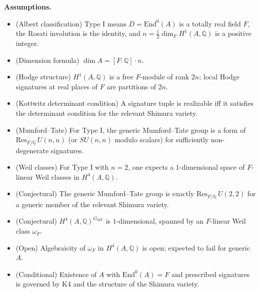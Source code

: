 \documentclass{article}
\begin{document}
\medskip

\noindent\textbf{Assumptions.}
\begin{itemize}
  \item[\textbf{K1}] (Albert classification) Type I means
    $D=\mathrm{End}^0(A)$ is a totally real field $F$, the Rosati involution is
    the identity, and $n=\tfrac12\dim_F H^1(A,\mathbb{Q})$ is a positive
    integer.
  \item[\textbf{K2}] (Dimension formula) $\dim A=[F:\mathbb{Q}]\cdot n$.
  \item[\textbf{K3}] (Hodge structure) $H^1(A,\mathbb{Q})$ is a free
    $F$-module of rank $2n$; local Hodge signatures at real places of $F$ are
    partitions of $2n$.
  \item[\textbf{K4}] (Kottwitz determinant condition) A signature tuple is
    realizable iff it satisfies the determinant condition for the relevant
    Shimura variety.
  \item[\textbf{K5}] (Mumford--Tate) For Type I, the generic Mumford--Tate
    group is a form of $\mathrm{Res}_{F/\mathbb{Q}}\,U(n,n)$ (or $SU(n,n)$
    modulo scalars) for sufficiently non-degenerate signatures.
  \item[\textbf{K6}] (Weil classes) For Type I with $n=2$, one expects a
    $1$-dimensional space of $F$-linear Weil classes in $H^4(A,\mathbb{Q})$.
  \item[\textbf{C1}] (Conjectural) The generic Mumford--Tate group is exactly
    $\mathrm{Res}_{F/\mathbb{Q}}\,U(2,2)$ for a generic member of the relevant
    Shimura variety.
  \item[\textbf{C2}] (Conjectural) $H^4(A,\mathbb{Q})^{G_{\mathrm{MT}}}$ is
    $1$-dimensional, spanned by an $F$-linear Weil class $\omega_F$.
  \item[\textbf{C3}] (Open) Algebraicity of $\omega_F$ in $H^4(A,\mathbb{Q})$
    is open; expected to fail for generic $A$.
  \item[\textbf{C4}] (Conditional) Existence of $A$ with
    $\mathrm{End}^0(A)=F$ and prescribed signatures is governed by K4 and the
    structure of the Shimura variety.
\end{itemize}

\medskip
\end{document}
